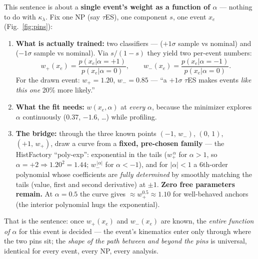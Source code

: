 \documentclass[11pt]{article}
\newcommand{\kl}{\ensuremath{\kappa_\lambda}}
\begin{document}
This sentence is about a \textbf{single event's weight as a function of $\alpha$} --- nothing to do with \kl.
Fix one NP (say $\tau$ES), one component $s$, one event $x_e$ (Fig.~\ref{fig:pins}):
\begin{enumerate}
\item \textbf{What is actually trained:} two classifiers --- ($+1\sigma$ sample vs nominal) and ($-1\sigma$
  sample vs nominal). Via $s/(1{-}s)$ they yield two per-event numbers:
\begin{equation}
w_+(x_e)=\frac{p(x_e|\alpha{=}{+}1)}{p(x_e|\alpha{=}0)},\qquad
w_-(x_e)=\frac{p(x_e|\alpha{=}{-}1)}{p(x_e|\alpha{=}0)}.
\end{equation}
For the drawn event: $w_+=1.20$, $w_-=0.85$ --- ``a $+1\sigma$ $\tau$ES makes events \emph{like this one} 20\%
more likely.''
\item \textbf{What the fit needs:} $w(x_e,\alpha)$ at \emph{every} $\alpha$, because the minimizer explores
  $\alpha$ continuously ($0.37$, $-1.6$, \dots) while profiling.
\item \textbf{The bridge:} through the three known points $(-1,\,w_-)$, $(0,\,1)$, $(+1,\,w_+)$, draw a curve
  from a \textbf{fixed, pre-chosen family} --- the HistFactory ``poly-exp'': exponential in the tails
  ($w_+^{\,\alpha}$ for $\alpha>1$, so $\alpha{=}{+}2\Rightarrow1.20^2=1.44$; $w_-^{\,|\alpha|}$ for
  $\alpha<-1$), and for $|\alpha|<1$ a 6th-order polynomial whose coefficients are \emph{fully determined} by
  smoothly matching the tails (value, first and second derivative) at $\pm1$. \textbf{Zero free parameters
  remain.} At $\alpha=0.5$ the curve gives $\approx w_+^{0.5}\approx1.10$ for well-behaved anchors (the interior
  polynomial hugs the exponential).
\end{enumerate}
That is the sentence: once $w_+(x_e)$ and $w_-(x_e)$ are known, the \emph{entire function of $\alpha$} for this
event is decided --- the event's kinematics enter only through where the two pins sit; the \emph{shape of the
path between and beyond the pins} is universal, identical for every event, every NP, every analysis.
\end{document}
